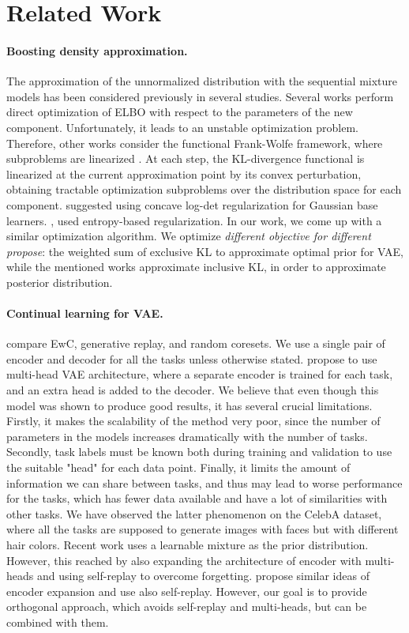 \section{Related Work}
\paragraph{Boosting density approximation.}
The approximation of the unnormalized distribution with the sequential mixture models has been considered previously in several studies. Several works \citep{miller2017variational,gershman2012nonparametric} perform direct optimization of ELBO with respect to the parameters of the new component. Unfortunately, it leads to an unstable optimization problem. Therefore, other works consider the functional Frank-Wolfe framework, where subproblems are linearized \citep{wang2015functional}. At each step, the KL-divergence functional is linearized at the current approximation point by its convex perturbation, obtaining tractable optimization subproblems over the distribution space for each component. \citet{guo2016boosting} suggested using concave log-det regularization for Gaussian base learners. \citet{egorov2019maxentropy}, \citet{locatello2018boosting} used entropy-based regularization. In our work, we come up with a similar optimization algorithm. We optimize \textit{different objective for different propose}: the weighted sum of exclusive KL to approximate optimal prior for VAE, while the mentioned works approximate inclusive KL, in order to approximate posterior distribution. 
\paragraph{Continual learning for VAE.}
\citet{lesort2019generative} compare EwC, generative replay, and random coresets. We use a single pair of encoder and decoder for all the tasks unless otherwise stated. \citet{nguyen2017variational} propose to use multi-head VAE architecture, where a separate encoder is trained for each task, and an extra head is added to the decoder. We believe that even though this model was shown to produce good results, it has several crucial limitations. Firstly, it makes the scalability of the method very poor, since the number of parameters in the models increases dramatically with the number of tasks. Secondly, task labels must be known both during training and validation to use the suitable "head" for each data point. Finally, it limits the amount of information we can share between tasks, and thus may lead to worse performance for the tasks, which has fewer data available and have a lot of similarities with other tasks. We have observed the latter phenomenon on the CelebA dataset, where all the tasks are supposed to generate images with faces but with different hair colors. Recent work \citep{rao2019continual} uses a learnable mixture as the prior distribution. However, this reached by also expanding the architecture of encoder with multi-heads and using self-replay to overcome forgetting. \citet{achillelife} propose similar ideas of encoder expansion and use also self-replay. However, our goal is to provide orthogonal approach, which avoids self-replay and multi-heads, but can be combined with them.

